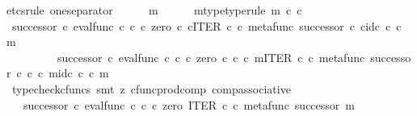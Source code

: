 \begin{isabellebody}
{\isacharparenleft}{\kern0pt}etcs{\isacharunderscore}{\kern0pt}rule\ one{\isacharunderscore}{\kern0pt}separator{\isacharparenright}{\kern0pt}\isanewline
\ \ \ \ \isamarkupfalse%
\ m\isanewline
\ \ \ \ \isamarkupfalse%
\ m{\isacharunderscore}{\kern0pt}type{\isacharbrackleft}{\kern0pt}type{\isacharunderscore}{\kern0pt}rule{\isacharbrackright}{\kern0pt}{\isacharcolon}{\kern0pt}\ {\isachardoublequoteopen}m\ {\isasymin}\isactrlsub c\ {\isasymnat}\isactrlsub c{\isachardoublequoteclose}\isanewline
\ \ \ \ \isamarkupfalse%
\ {\isachardoublequoteopen}{\isacharparenleft}{\kern0pt}successor\ {\isasymcirc}\isactrlsub c\ eval{\isacharunderscore}{\kern0pt}func\ {\isasymnat}\isactrlsub c\ {\isasymnat}\isactrlsub c\ {\isasymcirc}\isactrlsub c\ {\isasymlangle}zero\ {\isasymcirc}\isactrlsub c\ {\isasymbeta}\isactrlbsub {\isasymnat}\isactrlsub c\isactrlesub {\isacharcomma}{\kern0pt}ITER\ {\isasymnat}\isactrlsub c\ {\isasymcirc}\isactrlsub c\ {\isasymlangle}metafunc\ successor\ {\isasymcirc}\isactrlsub c\ {\isasymbeta}\isactrlbsub {\isasymnat}\isactrlsub c\isactrlesub {\isacharcomma}{\kern0pt}id\isactrlsub c\ {\isasymnat}\isactrlsub c{\isasymrangle}{\isasymrangle}{\isacharparenright}{\kern0pt}\ {\isasymcirc}\isactrlsub c\ m\ {\isacharequal}{\kern0pt}\ \isanewline
\ \ \ \ \ \ \ \ \ successor\ {\isasymcirc}\isactrlsub c\ eval{\isacharunderscore}{\kern0pt}func\ {\isasymnat}\isactrlsub c\ {\isasymnat}\isactrlsub c\ {\isasymcirc}\isactrlsub c\ {\isasymlangle}zero\ {\isasymcirc}\isactrlsub c\ {\isasymbeta}\isactrlbsub {\isasymnat}\isactrlsub c\isactrlesub \ {\isasymcirc}\isactrlsub c\ m{\isacharcomma}{\kern0pt}ITER\ {\isasymnat}\isactrlsub c\ {\isasymcirc}\isactrlsub c\ {\isasymlangle}metafunc\ successor\ {\isasymcirc}\isactrlsub c\ {\isasymbeta}\isactrlbsub {\isasymnat}\isactrlsub c\isactrlesub \ {\isasymcirc}\isactrlsub c\ m{\isacharcomma}{\kern0pt}id\isactrlsub c\ {\isasymnat}\isactrlsub c\ {\isasymcirc}\isactrlsub c\ m{\isasymrangle}{\isasymrangle}{\isachardoublequoteclose}\isanewline
\ \ \ \ \ \ \isamarkupfalse%
\ {\isacharparenleft}{\kern0pt}typecheck{\isacharunderscore}{\kern0pt}cfuncs{\isacharcomma}{\kern0pt}\ smt\ {\isacharparenleft}{\kern0pt}z{}{\isacharparenright}{\kern0pt}\ cfunc{\isacharunderscore}{\kern0pt}prod{\isacharunderscore}{\kern0pt}comp\ comp{\isacharunderscore}{\kern0pt}associative{}{\isacharparenright}{\kern0pt}\isanewline
\ \ \ \ \isamarkupfalse%
\ \isamarkupfalse%
\ {\isachardoublequoteopen}{\isachardot}{\kern0pt}{\isachardot}{\kern0pt}{\isachardot}{\kern0pt}\ {\isacharequal}{\kern0pt}\ successor\ {\isasymcirc}\isactrlsub c\ eval{\isacharunderscore}{\kern0pt}func\ {\isasymnat}\isactrlsub c\ {\isasymnat}\isactrlsub c\ {\isasymcirc}\isactrlsub c\ {\isasymlangle}zero\ {\isacharcomma}{\kern0pt}ITER\ {\isasymnat}\isactrlsub c\ {\isasymcirc}\isactrlsub c\ {\isasymlangle}metafunc\ successor\ {\isacharcomma}{\kern0pt}m{\isasymrangle}{\isasymrangle}{\isachardoublequoteclose}\isanewline

\end{isabellebody}
